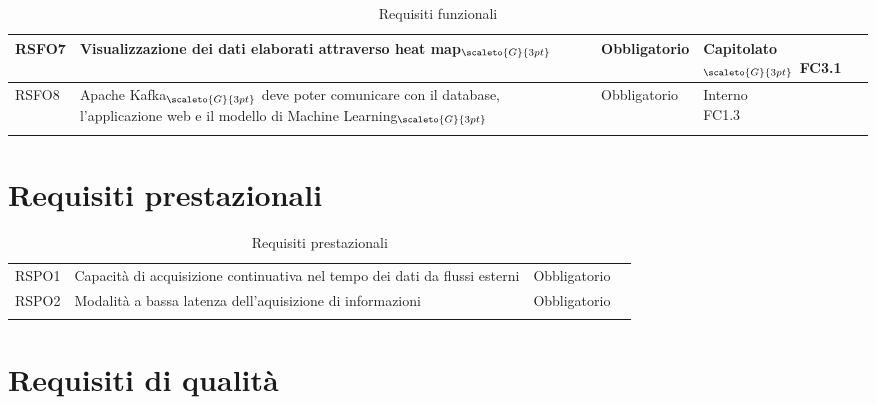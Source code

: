 {\begin{center}
\begin{longtable}{|p{3cm}|p{4cm}|p{4cm}|p{4cm}|}
			\hline
			\centering RSFO7 & Visualizzazione dei dati elaborati attraverso heat map$_{\scaleto{G}{3pt}}$ &\centering  Obbligatorio & \makecell[tc]{Capitolato$_{\scaleto{G}{3pt}}$ \\ FC3.1}  \\
			\hline
			\centering RSFO8 & Apache Kafka$_{\scaleto{G}{3pt}}$ deve poter comunicare con il database, l'applicazione web e il modello di Machine Learning$_{\scaleto{G}{3pt}}$  &\centering  Obbligatorio &  \makecell[tc]{Interno \\ FC1.3} 	\\	
			\hline
			
			\rowcolor{white}
			
			\caption[Requisiti funzionali]{Requisiti funzionali}\label{4.1}\\
	\end{longtable}%
	
\end{center}

\section{Requisiti prestazionali}\label{RequisitiPrestazionali}
\def\tabularxcolumn#1{m{#1}}
{
	
	\begin{center}
		\renewcommand{\arraystretch}{1.4}
		\begin{longtable}{|p{4cm}|p{4cm}|p{4cm}|p{3cm}|}
		\hline
		\rowcolor{airforceblue}
		\makecell[c]{\textbf{Codice RS}} & \makecell[c]{\textbf{Descrizione}} & \makecell[c]{\textbf{Tipo di requisito}} & \makecell[c]{\textbf{Fonte}} \\
		\hline
		\centering RSPO1 & Capacità di acquisizione continuativa nel tempo dei dati da flussi esterni &\centering  Obbligatorio & \makecell[tc]{Capitolato$_{\scaleto{G}{3pt}}$}  \\
		\hline
		\centering RSPO2 & Modalità a bassa latenza dell'aquisizione di informazioni & \centering Obbligatorio & \makecell[tc]{Capitolato$_{\scaleto{G}{3pt}}$} \\
		\hline
		\rowcolor{white}
		
		\caption[Requisiti prestazionali]{Requisiti prestazionali}\label{4.2}\\
			\end{longtable}
	\end{center}
\section{Requisiti di qualità}\label{RequisitiDiQualita}
\def\tabularxcolumn#1{m{#1}}
{
	
}}}
